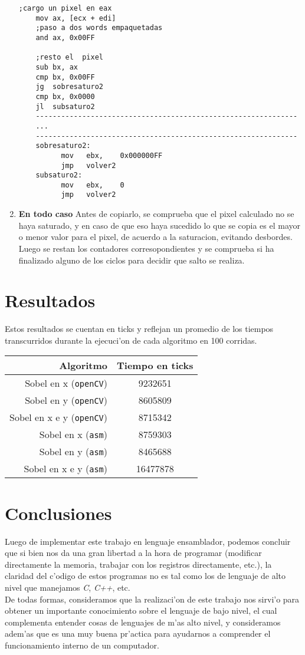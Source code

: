 \documentclass[11pt]{article}
\begin{document}
\begin{enumerate}
\begin{lstlisting}[frame=single]
	;cargo un pixel en eax		
	mov	ax,	[ecx + edi]	
	;paso a dos words empaquetadas
	and	ax,	0x00FF		
		
	;resto el  pixel
	sub	bx,	ax		
	cmp	bx,	0x00FF
	jg	sobresaturo2
	cmp	bx,	0x0000
	jl	subsaturo2
	--------------------------------------------------------------
	...
	--------------------------------------------------------------
	sobresaturo2:
	      mov	ebx,	0x000000FF
	      jmp	volver2
	subsaturo2:
	      mov	ebx,	0
	      jmp	volver2
\end{lstlisting}
\item \textbf{En todo caso}
\subitem Antes de copiarlo, se comprueba que el pixel calculado no se haya saturado, y en caso de que eso haya sucedido lo que se copia es el mayor o menor valor para el pixel, de acuerdo a la saturacion, evitando desbordes.
Luego se restan los contadores corresopondientes y se comprueba si ha finalizado alguno de los ciclos para decidir que salto se realiza.
\end{enumerate}


\newpage
\section{Resultados}
Estos resultados se cuentan en ticks y reflejan un promedio de los tiempos transcurridos durante la ejecuci'on de cada algoritmo en 100 corridas.
\begin{center}
 \begin{tabular}{| r | c |}
\hline
Algoritmo	&	Tiempo en ticks \\
\hline
Sobel en x (\verb'openCV')	&	9232651\\
Sobel en y (\verb'openCV')	&	8605809\\
Sobel en x e y (\verb'openCV')	&	8715342\\
\hline
Sobel en x (\verb'asm')	&	8759303\\
Sobel en y (\verb'asm')	&	8465688\\
Sobel en x e y (\verb'asm')	&	16477878\\
\hline
\end{tabular}
\end{center}
\section{Conclusiones}
Luego de implementar este trabajo en lenguaje ensamblador, podemos concluir que si bien nos da una gran libertad a la hora de programar (modificar directamente la memoria, trabajar con los registros directamente, etc.), la claridad del c'odigo de estos programas no es tal como los de lenguaje de alto nivel que manejamos \textit{C}, \textit{C++}, etc. \\
De todas formas, consideramos que la realizaci'on de este trabajo nos sirvi'o para obtener un importante conocimiento sobre el lenguaje de bajo nivel, el cual complementa entender cosas de lenguajes de m'as alto nivel, y consideramos adem'as que es una muy buena pr'actica para ayudarnos a comprender el funcionamiento interno de un computador.
\end{document}
